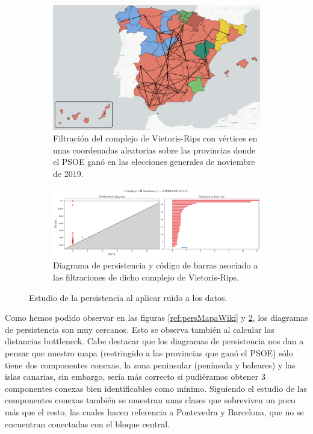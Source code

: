 \vspace*{\fill}
\newpage
\begin{figure}[!ht]
\centering
\begin{subfigure}[b]{\textwidth}
	\centering
	\includegraphics[width=\textwidth]{include/figuras/mapaRandom.png} 
	\caption{Filtración del complejo de Vietoris-Rips con vértices en unas coordenadas aleatorias sobre las provincias donde el PSOE ganó en las elecciones generales de noviembre de 2019.}
	\label{ref:mapaRandom}
\end{subfigure}
\begin{subfigure}[b]{\textwidth}
	\centering
	\includegraphics[width=\textwidth]{../code/output/ejemploMapa2.png} 
	\caption{Diagrama de persistencia y código de barras asociado a las filtraciones de dicho complejo de Vietoris-Rips.}
	\label{ref:persMapaRandom}
\end{subfigure}
\caption{Estudio de la persistencia al aplicar ruido a los datos.}
\label{ref:figMapaRandom}
\end{figure}

Como hemos podido observar en las figuras \ref{ref:persMapaWiki} y \ref{ref:persMapaRandom}, los diagramas de persistencia son muy cercanos. Esto se observa también al calcular las distancias bottleneck. Cabe destacar que los diagramas de persistencia nos dan a pensar que nuestro mapa (restringido a las provincias que ganó el PSOE) sólo tiene dos componentes conexas, la zona peninsular (península y baleares) y las islas canarias, sin embargo, sería más correcto si pudiéramos obtener 3 componentes conexas  bien identificables como mínimo. Siguiendo el estudio de las componentes conexas también se muestran unas clases que sobreviven un poco más que el resto, las cuales hacen referencia a Pontevedra y Barcelona, que no se encuentran conectadas con el bloque central.

